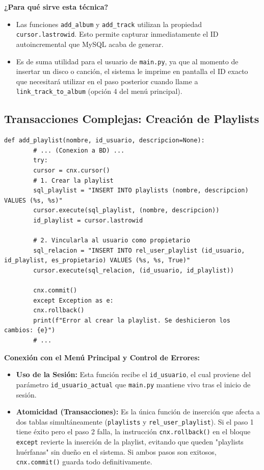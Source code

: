 \documentclass[11pt]{article}
\begin{document}
	\noindent\textbf{¿Para qué sirve esta técnica?}
	\begin{itemize}[noitemsep,topsep=2pt]
		\item Las funciones \texttt{add\_album} y \texttt{add\_track} utilizan la propiedad \texttt{cursor.lastrowid}. Esto permite capturar inmediatamente el ID autoincremental que MySQL acaba de generar.
		\item Es de suma utilidad para el usuario de \texttt{main.py}, ya que al momento de insertar un disco o canción, el sistema le imprime en pantalla el ID exacto que necesitará utilizar en el paso posterior cuando llame a \texttt{link\_track\_to\_album} (opción 4 del menú principal).
	\end{itemize}
	
	\vspace{0.5cm}
	
	\subsection{Transacciones Complejas: Creación de Playlists}
	\begin{lstlisting}[style=pythonstyle]
		def add_playlist(nombre, id_usuario, descripcion=None):
		# ... (Conexion a BD) ...
		try:
		cursor = cnx.cursor()
		# 1. Crear la playlist
		sql_playlist = "INSERT INTO playlists (nombre, descripcion) VALUES (%s, %s)"
		cursor.execute(sql_playlist, (nombre, descripcion))
		id_playlist = cursor.lastrowid
		
		# 2. Vincularla al usuario como propietario
		sql_relacion = "INSERT INTO rel_user_playlist (id_usuario, id_playlist, es_propietario) VALUES (%s, %s, True)"
		cursor.execute(sql_relacion, (id_usuario, id_playlist))
		
		cnx.commit()
		except Exception as e:
		cnx.rollback()
		print(f"Error al crear la playlist. Se deshicieron los cambios: {e}")
		# ...
	\end{lstlisting}
	
	\noindent\textbf{Conexión con el Menú Principal y Control de Errores:}
	\begin{itemize}[noitemsep,topsep=2pt]
		\item \textbf{Uso de la Sesión:} Esta función recibe el \texttt{id\_usuario}, el cual proviene del parámetro \texttt{id\_usuario\_actual} que \texttt{main.py} mantiene vivo tras el inicio de sesión.
		\item \textbf{Atomicidad (Transacciones):} Es la única función de inserción que afecta a dos tablas simultáneamente (\texttt{playlists} y \texttt{rel\_user\_playlist}). Si el paso 1 tiene éxito pero el paso 2 falla, la instrucción \texttt{cnx.rollback()} en el bloque \texttt{except} revierte la inserción de la playlist, evitando que queden "playlists huérfanas" sin dueño en el sistema. Si ambos pasos son exitosos, \texttt{cnx.commit()} guarda todo definitivamente.
	\end{itemize}
	
\end{document}
